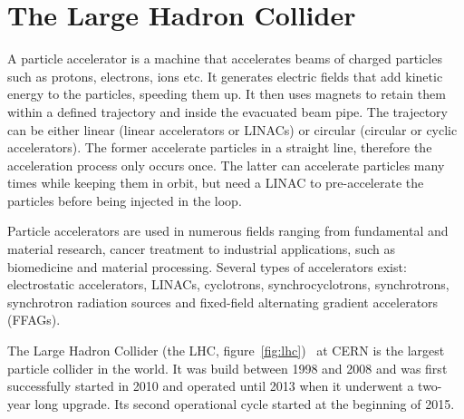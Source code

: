 \section{The Large Hadron Collider}
\label{subsec:lhc}
A particle accelerator is a machine that accelerates beams of charged particles such as protons, electrons, ions etc. It generates electric fields that add kinetic energy to the particles, speeding them up. It then uses magnets to retain them within a defined trajectory and inside the evacuated beam pipe. The trajectory can be either linear (linear accelerators or LINACs) or circular (circular or cyclic accelerators). The former accelerate particles in a straight line, therefore the acceleration process only occurs once. The latter can accelerate particles many times while keeping them in orbit, but need a LINAC to pre-accelerate the particles before being injected in the loop.

Particle accelerators are used in numerous fields ranging from fundamental and material research, cancer treatment to industrial applications, such as biomedicine and material processing. Several types of accelerators exist: electrostatic accelerators, LINACs, cyclotrons, synchrocyclotrons, synchrotrons, synchrotron radiation sources and fixed-field alternating gradient accelerators (FFAGs).

The Large Hadron Collider (the LHC, figure~\ref{fig:lhc})~\cite{Evans:1447127} at CERN is the largest particle collider in the world. It was build between 1998 and 2008 and was first successfully started in 2010 and operated until 2013 when it underwent a two-year long upgrade. Its second operational cycle started at the beginning of 2015.

